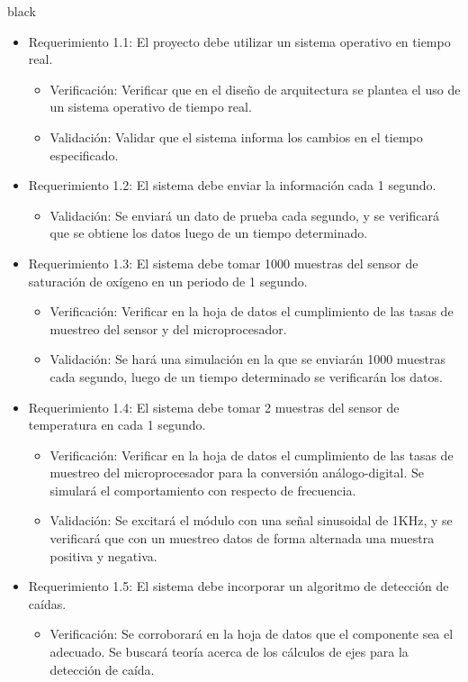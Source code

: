 \documentclass[11pt]{charter}
\begin{document}
\begin{consigna}{black}
\begin{itemize} 
\item Requerimiento 1.1: El proyecto debe utilizar un sistema operativo en tiempo real.
\begin{itemize}
\item Verificación: Verificar que en el diseño de arquitectura se plantea el uso de un sistema operativo de tiempo real.
\item Validación: Validar que el sistema informa los cambios en el tiempo especificado.
\end{itemize}
\item Requerimiento 1.2: El sistema debe enviar la información cada 1 segundo.
\begin{itemize}
\item Validación: Se enviará un dato de prueba cada segundo, y se verificará que se obtiene los datos luego de un tiempo determinado.
\end{itemize}
\item Requerimiento 1.3: El sistema debe tomar 1000 muestras del sensor de saturación de oxígeno en un periodo de 1 segundo.
\begin{itemize}
\item Verificación: Verificar en la hoja de datos el cumplimiento de las tasas de muestreo del sensor y del microprocesador.
\item Validación: Se hará una simulación en la que se enviarán 1000 muestras cada segundo, luego de un tiempo determinado se verificarán los datos. 
\end{itemize}
\item Requerimiento 1.4: El sistema debe tomar 2 muestras del sensor de temperatura en cada 1 segundo. 
\begin{itemize}
\item Verificación: Verificar en la hoja de datos el cumplimiento de las tasas de muestreo del microprocesador para la conversión análogo-digital. Se simulará el comportamiento con respecto de frecuencia.
\item Validación: Se excitará el módulo con una señal sinusoidal de 1KHz, y se verificará que con un muestreo datos de forma alternada una muestra positiva y negativa.
\end{itemize}
\item Requerimiento 1.5: El sistema debe incorporar un algoritmo de detección de caídas.
\begin{itemize}
\item Verificación: Se corroborará en la hoja de datos que el componente sea el adecuado. Se buscará teoría acerca de los cálculos de ejes para la detección de caída.

\end{itemize}
\end{itemize}
\end{consigna}
\end{document}

